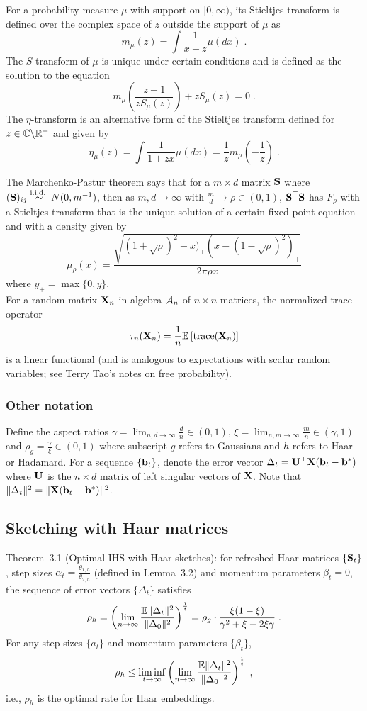 \documentclass[10pt]{article}
\begin{document}
For a probability measure $\mu$ with support on $[0,\infty)$, its Stieltjes transform is defined over the complex space of $z$ outside the support of $\mu$ as
\[
m_\mu(z) = \int \frac{1}{x-z}\mu(dx) \;.
\]
The $S$-transform of $\mu$ is unique under certain conditions and is defined as the solution to the equation
\[
m_\mu\left(\frac{z+1}{zS_\mu(z)}\right) + zS_\mu(z) = 0\;.
\]
The $\eta$-transform is an alternative form of the Stieltjes transform defined for $z\in\mathbb{C}\backslash\mathbb{R}^-$ and given by
\[
\eta_\mu(z) = \int\frac{1}{1+zx}\mu(dx) = \frac{1}{z}m_\mu\left(-\frac{1}{z}\right) \;.
\]

The Marchenko-Pastur theorem says that for a $m\times d$ matrix $\mathbf{S}$ where $(\mathbf{S})_{ij}\overset{\text{i.i.d.\ }}{\sim}N(0,m^{-1})$, then as $m,d\rightarrow\infty$ with $\frac{m}{d}\rightarrow\rho\in(0,1)$, $\mathbf{S}^\top\mathbf{S}$ has \lsd $F_\rho$ with a Stieltjes transform that is the unique solution of a certain fixed point equation and with a density given by
\[
\mu_\rho(x) = \frac{\sqrt{(1+\sqrt{\rho})^2-x)_+(x-(1-\sqrt{\rho})^2)_+}}{2\pi\rho x}
\]
where $y_+=\max\{0,y\}$.
\\

For a random matrix $\mathbf{X}_n$ in algebra $\mathcal{A}_n$ of $n\times n$ matrices, the normalized trace operator
\[
\tau_n(\mathbf{X}_n) = \frac{1}{n}\mathbb{E}\left[\mathrm{trace}(\mathbf{X}_n)\right]
\]
is a linear functional (and is analogous to expectations with scalar random variables; see Terry Tao's notes on free probability).


\subsubsection{Other notation}

Define the aspect ratios $\gamma = \lim_{n,d\rightarrow\infty}\frac{d}{n}\in(0,1)$, $\xi = \lim_{n,m\rightarrow\infty}\frac{m}{n}\in(\gamma,1)$ and $\rho_g=\frac{\gamma}{\xi}\in(0,1)$ where subscript $g$ refers to Gaussians and $h$ refers to Haar or Hadamard. For a sequence $\{\mathbf{b}_t\}$, denote the error vector $\Delta_t = \mathbf{U}^\top\mathbf{X}(\mathbf{b}_t-\mathbf{b}^*)$ where $\mathbf{U}$ is the $n\times d$ matrix of left singular vectors of $\mathbf{X}$. Note that $\|\Delta_t\|^2 = \|\mathbf{X}(\mathbf{b}_t-\mathbf{b}^*)\|^2$.


\subsection{Sketching with Haar matrices}

Theorem~3.1 (Optimal IHS with Haar sketches): for refreshed Haar matrices $\{\mathbf{S}_t\}$, step sizes $\alpha_t=\frac{\theta_{1,h}}{\theta_{2,h}}$ (defined in Lemma~3.2) and momentum parameters $\beta_t=0$, the sequence of error vectors $\{\Delta_t\}$ satisfies
\[
\rho_h = \left(\lim_{n\rightarrow\infty}\frac{\mathbb{E}\|\Delta_t\|^2}{\|\Delta_0\|^2}\right)^\frac{1}{t} = \rho_g\cdot\frac{\xi(1-\xi)}{\gamma^2+\xi-2\xi\gamma} \;.
\]
For any step sizes $\{a_t\}$ and momentum parameters $\{\beta_t\}$,
\[
\rho_h \leq \liminf_{t\rightarrow\infty}\left(\lim_{n\rightarrow\infty}\frac{\mathbb{E}\|\Delta_t\|^2}{\|\Delta_0\|^2}\right)^\frac{1}{t} \;,
\]
i.e., $\rho_h$ is the optimal rate for Haar embeddings.
\\
\end{document}

